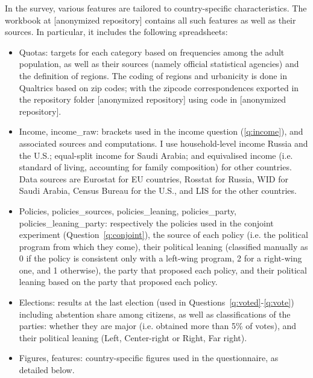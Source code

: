 In the survey, various features are tailored to country-specific characteristics. 
The workbook at [anonymized repository] contains all such features as well as their sources. %
In particular, it includes the following spreadsheets:
\begin{itemize}
    \item Quotas: targets for each category based on frequencies among the adult population, as well as their sources (namely official statistical agencies) and the definition of regions. The coding of regions and urbanicity is done in Qualtrics based on zip codes; with the zipcode correspondences exported in the repository folder [anonymized repository] using code in [anonymized repository]. %
    \item Income, income\_raw: brackets used in the income question (\ref{q:income}), and associated sources and computations. I use household-level income Russia and the U.S.; equal-split income for Saudi Arabia; and equivalised income (i.e. standard of living, accounting for family composition) for other countries. Data sources are Eurostat for EU countries, Rosstat for Russia, WID for Saudi Arabia, Census Bureau for the U.S., and LIS for the other countries. 
    \item Policies, policies\_sources, policies\_leaning, policies\_party, policies\_leaning\_party: respectively the policies used in the conjoint experiment (Question~\ref{q:conjoint}), the source of each policy (i.e. the political program from which they come), their political leaning (classified manually as 0 if the policy is consistent only with a left-wing program, 2 for a right-wing one, and 1 otherwise), the party that proposed each policy, and their political leaning based on the party that proposed each policy.
    \item Elections: results at the last election (used in Questions~\ref{q:voted}-\ref{q:vote}) including abstention share among citizens, as well as classifications of the parties: whether they are major (i.e. obtained more than 5\% of votes), and their political leaning (Left, Center-right or Right, Far right). 
    \item Figures, features: country-specific figures used in the questionnaire, as detailed below.
\end{itemize}



